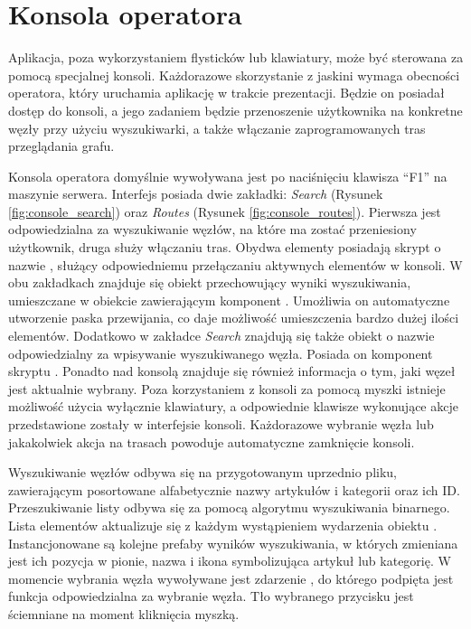 \section{Konsola operatora}
Aplikacja, poza wykorzystaniem flysticków lub klawiatury, może być sterowana za pomocą specjalnej konsoli. Każdorazowe skorzystanie z jaskini wymaga obecności operatora, który uruchamia aplikację w trakcie prezentacji. Będzie on posiadał dostęp do konsoli, a jego zadaniem będzie przenoszenie użytkownika na konkretne węzły przy użyciu wyszukiwarki, a także włączanie zaprogramowanych tras przeglądania grafu. 

Konsola operatora domyślnie wywoływana jest po naciśnięciu klawisza ``F1'' na maszynie serwera. Interfejs posiada dwie zakładki: \textit{Search} (Rysunek \ref{fig:console_search}) oraz \textit{Routes} (Rysunek \ref{fig:console_routes}). Pierwsza jest odpowiedzialna za wyszukiwanie węzłów, na które ma zostać przeniesiony użytkownik, druga służy włączaniu tras. Obydwa elementy posiadają skrypt o nazwie , służący odpowiedniemu przełączaniu aktywnych elementów w konsoli. W obu zakładkach znajduje się obiekt przechowujący wyniki wyszukiwania, umieszczane w obiekcie zawierającym komponent  . Umożliwia on automatyczne utworzenie paska przewijania, co daje możliwość umieszczenia bardzo dużej ilości elementów.  Dodatkowo w zakładce \textit{Search} znajdują się także obiekt o nazwie   odpowiedzialny za wpisywanie wyszukiwanego węzła. Posiada on komponent skryptu  . Ponadto nad konsolą znajduje się również informacja o tym, jaki węzeł jest aktualnie wybrany. Poza korzystaniem z konsoli za pomocą myszki istnieje możliwość użycia wyłącznie klawiatury, a odpowiednie klawisze wykonujące akcje przedstawione zostały w interfejsie konsoli. Każdorazowe wybranie węzła lub jakakolwiek akcja na trasach powoduje automatyczne zamknięcie konsoli.


Wyszukiwanie węzłów odbywa się na przygotowanym uprzednio pliku, zawierającym posortowane alfabetycznie nazwy artykułów i kategorii oraz ich ID. Przeszukiwanie listy odbywa się za pomocą algorytmu wyszukiwania binarnego. Lista elementów aktualizuje się z każdym wystąpieniem wydarzenia  obiektu  . Instancjonowane są kolejne prefaby wyników wyszukiwania, w których zmieniana jest ich pozycja w pionie, nazwa i ikona symbolizująca artykuł lub kategorię. W momencie wybrania węzła wywoływane jest zdarzenie  , do którego podpięta jest funkcja   odpowiedzialna za wybranie węzła. Tło wybranego przycisku jest ściemniane na moment kliknięcia myszką.

